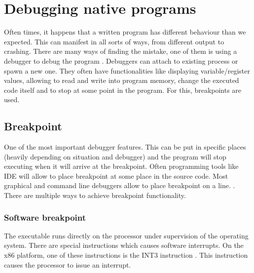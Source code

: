 \chapter{Debugging native programs}
Often times, it happens that a written program has different behaviour than we expected. This can manifest in all sorts of ways, from different output to crashing. There are many ways of finding the mistake, one of them is using a debugger to debug the program \cite{software-debugging-testing-verification}.
Debuggers can attach to existing process or spawn a new one. They often have functionalities like displaying variable/register values, allowing to read and write into program memory, change the executed code itself and to stop at some point in the program. For this, breakpoints are used.

\section{Breakpoint}
One of the most important debugger features. This can be put in specific places (heavily depending on situation and debugger) and the program will stop executing when it will arrive at the breakpoint. Often programming tools like IDE will allow to place breakpoint at some place in the source code. Most graphical and command line debuggers allow to place breakpoint on a line. . There are multiple ways to achieve breakpoint functionality.

\subsection{Software breakpoint}
The executable runs directly on the processor under supervision of the operating system. There are special instructions which causes software interrupts. On the x86 platform, one of these instructions is the INT3 instruction \cite{xmlgen}. This instruction causes the processor to issue an interrupt.


